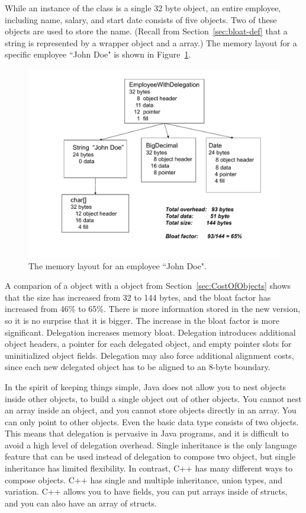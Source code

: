 While an instance of the  class is a single 32
byte object, an entire employee, including name, salary, and start date
consists of five objects. Two of these objects are used to store the name.
(Recall from Section~\ref{sec:bloat-def} that a string is represented by a
wrapper  object and a  array.) The memory layout for
a specific employee ``John Doe" is shown in Figure~\ref{fig:employee-status}.
 \begin{figure}
  \centering
 \includegraphics[width=.80\textwidth]{Figures/chapter4/employee-status.pdf}
  \caption{The memory layout for an employee ``John Doe".}
  \label{fig:employee-status}
\end{figure}

A comparion of a  object with a
 object from Section~\ref{sec:CostOfObjects} shows that
the size has increased from 32 to 144 bytes, and the bloat factor has increased from 46\% to 65\%. There is more information stored in the new version, so it is no surprise that it is bigger. The increase in the bloat factor is more significant. Delegation increases memory bloat. Delegation introduces additional object headers, a pointer for each delegated object, and empty pointer slots for uninitialized object fields. Delegation may also force additional alignment costs, since each new delegated object has to be aligned to an 8-byte boundary.

In the spirit of keeping things simple, Java does not allow you to nest objects
inside other objects, to build a single object out of other objects. You cannot
nest an array inside an object, and you cannot store objects directly in an
array.  You can only point to other objects. Even the basic data type
 consists of two objects. This means that delegation is pervasive
in Java programs, and it is difficult to avoid a high level of delegation
overhead. Single inheritance is the only language feature that can be used
instead of delegation to compose two object, but single inheritance has limited
flexibility.  In contrast, C++ has many different ways to compose objects. C++
has single and multiple inheritance, union types, and variation. C++ allows you
to have  fields, you can put arrays inside of structs, and you can
also have an array of structs.

